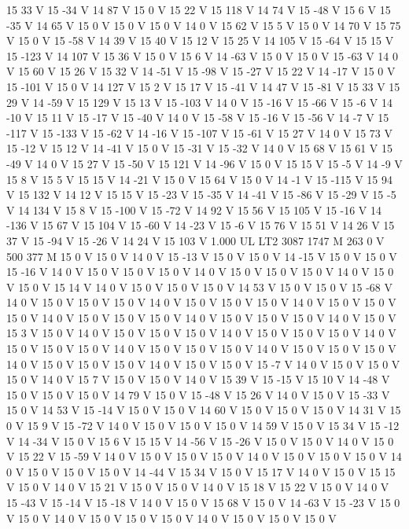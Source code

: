 {{15 33 V
15 -34 V
14 87 V
15 0 V
15 22 V
15 118 V
14 74 V
15 -48 V
15 6 V
15 -35 V
14 65 V
15 0 V
15 0 V
15 0 V
14 0 V
15 62 V
15 5 V
15 0 V
14 70 V
15 75 V
15 0 V
15 -58 V
14 39 V
15 40 V
15 12 V
15 25 V
14 105 V
15 -64 V
15 15 V
15 -123 V
14 107 V
15 36 V
15 0 V
15 6 V
14 -63 V
15 0 V
15 0 V
15 -63 V
14 0 V
15 60 V
15 26 V
15 32 V
14 -51 V
15 -98 V
15 -27 V
15 22 V
14 -17 V
15 0 V
15 -101 V
15 0 V
14 127 V
15 2 V
15 17 V
15 -41 V
14 47 V
15 -81 V
15 33 V
15 29 V
14 -59 V
15 129 V
15 13 V
15 -103 V
14 0 V
15 -16 V
15 -66 V
15 -6 V
14 -10 V
15 11 V
15 -17 V
15 -40 V
14 0 V
15 -58 V
15 -16 V
15 -56 V
14 -7 V
15 -117 V
15 -133 V
15 -62 V
14 -16 V
15 -107 V
15 -61 V
15 27 V
14 0 V
15 73 V
15 -12 V
15 12 V
14 -41 V
15 0 V
15 -31 V
15 -32 V
14 0 V
15 68 V
15 61 V
15 -49 V
14 0 V
15 27 V
15 -50 V
15 121 V
14 -96 V
15 0 V
15 15 V
15 -5 V
14 -9 V
15 8 V
15 5 V
15 15 V
14 -21 V
15 0 V
15 64 V
15 0 V
14 -1 V
15 -115 V
15 94 V
15 132 V
14 12 V
15 15 V
15 -23 V
15 -35 V
14 -41 V
15 -86 V
15 -29 V
15 -5 V
14 134 V
15 8 V
15 -100 V
15 -72 V
14 92 V
15 56 V
15 105 V
15 -16 V
14 -136 V
15 67 V
15 104 V
15 -60 V
14 -23 V
15 -6 V
15 76 V
15 51 V
14 26 V
15 37 V
15 -94 V
15 -26 V
14 24 V
15 103 V
1.000 UL
LT2
3087 1747 M
263 0 V
500 377 M
15 0 V
15 0 V
14 0 V
15 -13 V
15 0 V
15 0 V
14 -15 V
15 0 V
15 0 V
15 -16 V
14 0 V
15 0 V
15 0 V
15 0 V
14 0 V
15 0 V
15 0 V
15 0 V
14 0 V
15 0 V
15 0 V
15 14 V
14 0 V
15 0 V
15 0 V
15 0 V
14 53 V
15 0 V
15 0 V
15 -68 V
14 0 V
15 0 V
15 0 V
15 0 V
14 0 V
15 0 V
15 0 V
15 0 V
14 0 V
15 0 V
15 0 V
15 0 V
14 0 V
15 0 V
15 0 V
15 0 V
14 0 V
15 0 V
15 0 V
15 0 V
14 0 V
15 0 V
15 3 V
15 0 V
14 0 V
15 0 V
15 0 V
15 0 V
14 0 V
15 0 V
15 0 V
15 0 V
14 0 V
15 0 V
15 0 V
15 0 V
14 0 V
15 0 V
15 0 V
15 0 V
14 0 V
15 0 V
15 0 V
15 0 V
14 0 V
15 0 V
15 0 V
15 0 V
14 0 V
15 0 V
15 0 V
15 -7 V
14 0 V
15 0 V
15 0 V
15 0 V
14 0 V
15 7 V
15 0 V
15 0 V
14 0 V
15 39 V
15 -15 V
15 10 V
14 -48 V
15 0 V
15 0 V
15 0 V
14 79 V
15 0 V
15 -48 V
15 26 V
14 0 V
15 0 V
15 -33 V
15 0 V
14 53 V
15 -14 V
15 0 V
15 0 V
14 60 V
15 0 V
15 0 V
15 0 V
14 31 V
15 0 V
15 9 V
15 -72 V
14 0 V
15 0 V
15 0 V
15 0 V
14 59 V
15 0 V
15 34 V
15 -12 V
14 -34 V
15 0 V
15 6 V
15 15 V
14 -56 V
15 -26 V
15 0 V
15 0 V
14 0 V
15 0 V
15 22 V
15 -59 V
14 0 V
15 0 V
15 0 V
15 0 V
14 0 V
15 0 V
15 0 V
15 0 V
14 0 V
15 0 V
15 0 V
15 0 V
14 -44 V
15 34 V
15 0 V
15 17 V
14 0 V
15 0 V
15 15 V
15 0 V
14 0 V
15 21 V
15 0 V
15 0 V
14 0 V
15 18 V
15 22 V
15 0 V
14 0 V
15 -43 V
15 -14 V
15 -18 V
14 0 V
15 0 V
15 68 V
15 0 V
14 -63 V
15 -23 V
15 0 V
15 0 V
14 0 V
15 0 V
15 0 V
15 0 V
14 0 V
15 0 V
15 0 V
15 0 V
}}
